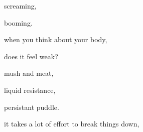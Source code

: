 \documentclass[extrafontsizes, 48pt]{memoir}
\newcommand\blankpage{%
    \null
    \thispagestyle{empty}%
    \addtocounter{page}{-1}%
    \newpage}
\begin{document}
	\begin{minipage}{.6\textwidth}
	screaming,
	\end{minipage}
	\newpage

	\begin{minipage}{.6\textwidth}
	booming.
	\afterpage{\blankpage}
	\end{minipage}
	\newpage

	\begin{minipage}{.6\textwidth}
	when you think about your body,
	\end{minipage}
	\newpage

	\begin{minipage}{.6\textwidth}
	does it feel weak?
	\end{minipage}
	\newpage

	\begin{minipage}{.6\textwidth}
	mush and meat,
	\end{minipage}
	\newpage

	\begin{minipage}{.6\textwidth}
	liquid resistance,
	\end{minipage}
	\newpage

	\begin{minipage}{.6\textwidth}
	persistant puddle.
	\afterpage{\blankpage}
	\end{minipage}
	\newpage

	\begin{minipage}{.6\textwidth}
	it takes a lot of effort to break things down,
	\end{minipage}
	\newpage
\end{document}
